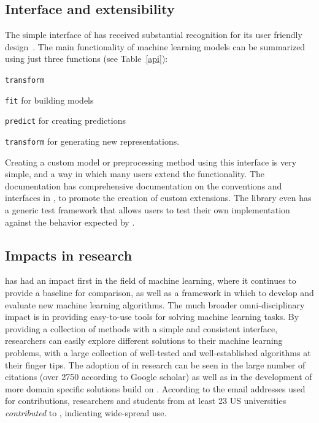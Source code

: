 \subsection{Interface and extensibility}
The simple interface of \sklearn{} has received substantial
recognition for its user friendly design~\cite{benlorica, testimonials}.
The main functionality of machine learning models can
be summarized using just three functions (see Table~\ref{api}):
\begin{labeling}{\texttt{transform}}
    \item[\texttt{fit}] for building models
    \item[\texttt{predict}] for creating predictions
    \item[\texttt{transform}] for generating new representations.
\end{labeling}
Creating a custom model or preprocessing method using this interface is very simple,
and a way in which many users extend the functionality. The \sklearn{} documentation
has comprehensive documentation on the conventions and interfaces in \sklearn{},
to promote the creation of custom extensions.
The \sklearn{} library even has a generic test framework that allows users to
test their own implementation against the behavior expected by \sklearn{}.

\subsection{Impacts in research}
\sklearn{} has had an impact first in the field of machine learning,
where it continues to provide a baseline for comparison, as well as a
framework in which to develop and evaluate new machine learning algorithms.
The much broader omni-disciplinary impact is in providing easy-to-use
tools for solving machine learning tasks. By providing a collection
of methods with a simple and consistent interface, researchers
can easily explore different solutions to their machine learning problems,
with a large collection of well-tested and well-established algorithms
at their finger tips.
The adoption of \sklearn{} in research can be seen in the large number
of citations (over 2750 according to Google scholar) as well as in the development
of more domain specific solutions build on \sklearn{}.
According to the email addresses used for contributions, researchers and students
from at least 23 US universities \emph{contributed} to \sklearn{}, indicating wide-spread use.

